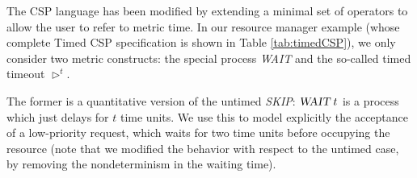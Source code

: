\begin{example}
The CSP language has been modified \cite{DS95,Sch00} by extending a minimal set of operators to allow 
the user to refer to metric time. In our resource manager 
example (whose complete Timed CSP specification is shown in Table \ref{tab:timedCSP}), 
we only consider two metric constructs: the special process \textsl{WAIT}
and the so-called timed timeout $\rhd^t$.

The former is a quantitative version of the untimed \textsl{SKIP}: $\textsl{WAIT}\; t$
is a process which just delays for $t$ time units. We use this 
to model explicitly the acceptance of a low-priority request, 
which waits for two time units before occupying the resource 
(note that we modified the behavior with respect to the untimed 
case, by removing the nondeterminism in the waiting time).


\end{example}
